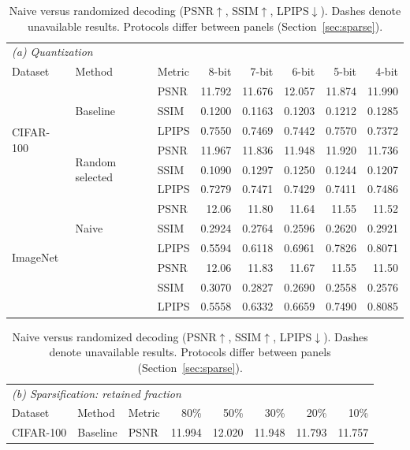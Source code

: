 \begin{table}[!t]
\centering
\caption{Naive versus randomized decoding (PSNR$\uparrow$, SSIM$\uparrow$,
LPIPS$\downarrow$). Dashes denote unavailable results.
Protocols differ between panels (Section~\ref{sec:sparse}).}
\label{tab:compression}
\label{tab:bits}
\small
\setlength{\tabcolsep}{0.8pt}
\renewcommand{\arraystretch}{1.0}
\begin{tabular*}{\columnwidth}{@{\extracolsep{\fill}}lllrrrrr@{}}
\toprule
\multicolumn{8}{l}{\textit{(a) Quantization}}\\
Dataset & Method & Metric & 8-bit & 7-bit & 6-bit & 5-bit & 4-bit\\
\midrule
\multirow{6}{*}{CIFAR-100} & \multirow{3}{*}{Baseline} & PSNR & 11.792 & 11.676 & 12.057 & 11.874 & 11.990\\
 &  & SSIM & 0.1200 & 0.1163 & 0.1203 & 0.1212 & 0.1285\\
 &  & LPIPS & 0.7550 & 0.7469 & 0.7442 & 0.7570 & 0.7372\\
 & \multirow{3}{*}{Random selected} & PSNR & 11.967 & 11.836 & 11.948 & 11.920 & 11.736\\
 &  & SSIM & 0.1090 & 0.1297 & 0.1250 & 0.1244 & 0.1207\\
 &  & LPIPS & 0.7279 & 0.7471 & 0.7429 & 0.7411 & 0.7486\\
\midrule
\multirow{6}{*}{ImageNet} & \multirow{3}{*}{Naive} & PSNR & 12.06 & 11.80 & 11.64 & 11.55 & 11.52\\
 &  & SSIM & 0.2924 & 0.2764 & 0.2596 & 0.2620 & 0.2921\\
 &  & LPIPS & 0.5594 & 0.6118 & 0.6961 & 0.7826 & 0.8071\\
 & \multirow{3}{*}{\cora{}} & PSNR & 12.06 & 11.83 & 11.67 & 11.55 & 11.50\\
 &  & SSIM & 0.3070 & 0.2827 & 0.2690 & 0.2558 & 0.2576\\
 &  & LPIPS & 0.5558 & 0.6332 & 0.6659 & 0.7490 & 0.8085\\
\bottomrule
\end{tabular*}
\par\smallskip
\begin{tabular*}{\columnwidth}{@{\extracolsep{\fill}}lllrrrrr@{}}
\toprule
\multicolumn{8}{l}{\textit{(b) Sparsification: retained fraction}}\\
Dataset & Method & Metric & 80\% & 50\% & 30\% & 20\% & 10\%\\
\midrule
\multirow{6}{*}{CIFAR-100} & \multirow{3}{*}{Baseline} & PSNR & 11.994 & 12.020 & 11.948 & 11.793 & 11.757\\

\end{tabular*}
\end{table}
